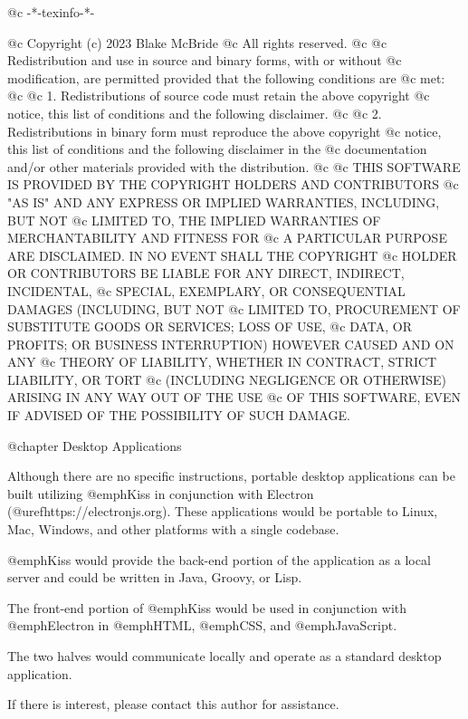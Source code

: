@c -*-texinfo-*-

@c  Copyright (c) 2023 Blake McBride
@c  All rights reserved.
@c
@c  Redistribution and use in source and binary forms, with or without
@c  modification, are permitted provided that the following conditions are
@c  met:
@c
@c  1. Redistributions of source code must retain the above copyright
@c  notice, this list of conditions and the following disclaimer.
@c
@c  2. Redistributions in binary form must reproduce the above copyright
@c  notice, this list of conditions and the following disclaimer in the
@c  documentation and/or other materials provided with the distribution.
@c
@c  THIS SOFTWARE IS PROVIDED BY THE COPYRIGHT HOLDERS AND CONTRIBUTORS
@c  "AS IS" AND ANY EXPRESS OR IMPLIED WARRANTIES, INCLUDING, BUT NOT
@c  LIMITED TO, THE IMPLIED WARRANTIES OF MERCHANTABILITY AND FITNESS FOR
@c  A PARTICULAR PURPOSE ARE DISCLAIMED. IN NO EVENT SHALL THE COPYRIGHT
@c  HOLDER OR CONTRIBUTORS BE LIABLE FOR ANY DIRECT, INDIRECT, INCIDENTAL,
@c  SPECIAL, EXEMPLARY, OR CONSEQUENTIAL DAMAGES (INCLUDING, BUT NOT
@c  LIMITED TO, PROCUREMENT OF SUBSTITUTE GOODS OR SERVICES; LOSS OF USE,
@c  DATA, OR PROFITS; OR BUSINESS INTERRUPTION) HOWEVER CAUSED AND ON ANY
@c  THEORY OF LIABILITY, WHETHER IN CONTRACT, STRICT LIABILITY, OR TORT
@c  (INCLUDING NEGLIGENCE OR OTHERWISE) ARISING IN ANY WAY OUT OF THE USE
@c  OF THIS SOFTWARE, EVEN IF ADVISED OF THE POSSIBILITY OF SUCH DAMAGE.


@chapter Desktop Applications

Although there are no specific instructions, portable desktop
applications can be built utilizing @emph{Kiss} in conjunction with
Electron (@uref{https://electronjs.org}).  These
applications would be portable to Linux, Mac, Windows, and other
platforms with a single codebase.

@emph{Kiss} would provide the back-end portion of the application as a
local server and could be written in Java, Groovy, or Lisp.  

The front-end portion of @emph{Kiss} would be used in conjunction with
@emph{Electron} in @emph{HTML}, @emph{CSS}, and @emph{JavaScript}.

The two halves would communicate locally and operate as a standard
desktop application.

If there is interest, please contact this author for assistance.
